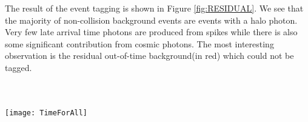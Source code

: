 \vspace{5mm}
The result of the event tagging is shown in Figure \ref{fig:RESIDUAL}. We see that the majority of non-collision background events are events with a halo photon. Very few late arrival time photons are produced from spikes while there is also some significant contribution from cosmic photons. The most interesting observation is the residual out-of-time background(in red) which could not be tagged. 

\paragraph*{}\mbox{}\\
\begin{minipage}{0.90\linewidth} 
\begin{center}
  \captionsetup{type=figure}
   \texttt{[image: TimeForAll]}
   \label{fig:RESIDUAL}
\end{center}
\end{minipage}

